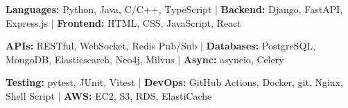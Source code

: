 %
\item\small{\textbf{Languages:} Python, Java, C/C++, TypeScript $|$ \textbf{Backend:} Django, FastAPI, Express.js $|$ \textbf{Frontend:} HTML, CSS, JavaScript, React}
\item\small{\textbf{APIs:} RESTful, WebSocket, Redis Pub/Sub $|$ \textbf{Databases:} PostgreSQL, MongoDB, Elasticsearch, Neo4j, Milvus $|$ \textbf{Async:} asyncio, Celery}
\item\small{\textbf{Testing:} pytest, JUnit, Vitest $|$ \textbf{DevOps:} GitHub Actions, Docker, git, Nginx, Shell Script $|$ \textbf{AWS:} EC2, S3, RDS, ElastiCache}%
